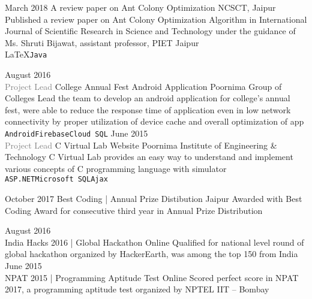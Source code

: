 \documentclass[9pt]{myOwnClass}
\begin{document}
\pagebreak
{}

\begin{entrylist}
	\entry
		{March 2018}
		{A review paper on Ant Colony Optimization}
		{NCSCT, Jaipur}
		{Published a review paper on Ant Colony Optimization Algorithm in International Journal of Scientific Research in Science and Technology under the guidance of Ms. Shruti Bijawat, assistant professor, PIET Jaipur\\ \LaTeX\slashsep\texttt{Java}}
	
	\entry
		{August 2016\\\footnotesize{\textcolor{gray}{Project Lead}}}
		{College Annual Fest Android Application}
		{Poornima Group of Colleges}
		{Lead the team to develop an android application for college's annual fest, were able to reduce the response time of application even in low network connectivity by proper utilization of device cache and overall optimization of app\\ \texttt{Android}\slashsep\texttt{Firebase}\slashsep\texttt{Cloud SQL}}
		\entry
		{June 2015\\\footnotesize{\textcolor{gray}{Project Lead}}}
		{C Virtual Lab Website}
		{Poornima Institute of Engineering \& Technology}
		{C Virtual Lab provides an easy way to understand and implement various concepts of C programming language with simulator\\ \texttt{ASP.NET}\slashsep\texttt{Microsoft SQL}\slashsep\texttt{Ajax}}
\end{entrylist}


\begin{entrylist}
	\entry
		{October 2017}
		{Best Coding | Annual Prize Distibution}
		{Jaipur}
		{Awarded with Best Coding Award for consecutive third year in Annual Prize Distribution}
	
	\entry
		{August 2016\\}
		{India Hacks 2016 | Global Hackathon}
		{Online}
		{Qualified for national level round of global hackathon organized by HackerEarth, was among the top 150 from India}
		\entry
		{June 2015\\}
		{NPAT 2015 | Programming Aptitude Test}
		{Online}
		{Scored perfect score in NPAT 2017, a programming aptitude test organized by NPTEL IIT -- Bombay}
\end{entrylist}

\end{document}
